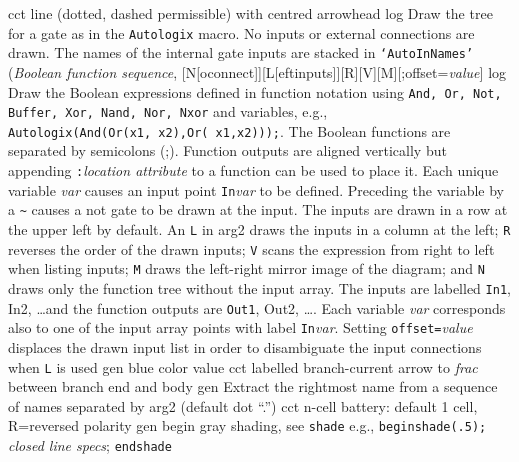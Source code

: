   {cct}
  {line (dotted, dashed permissible) with centred arrowhead
    }
  {log}
  {Draw the tree for a gate as in the {\tt Autologix} macro.  No inputs
   or external connections are drawn.  The names of the internal gate
   inputs are stacked in {\tt `AutoInNames'}}
%
 {({\sl Boolean function sequence},%
    [N[oconnect]][L[eftinputs]][R][V][M][;offset={\sl value}]}
  {log}
  {Draw the Boolean expressions defined in function notation
   using {\tt And, Or, Not, Buffer, Xor, Nand, Nor, Nxor}
   and variables, e.g.,
   {\tt Autologix(And(Or(x1,~x2),Or(~x1,x2)));}.
   The Boolean functions are separated by semicolons (;). Function
   outputs are aligned vertically but appending
   {\tt:}{\sl location attribute} to a function can be used to place it.
   Each unique variable {\sl var} causes an input point {\tt In}{\sl var} 
   to be defined.  Preceding the variable by a {\tt \~{}} causes a not gate
   to be drawn at the input.
   The inputs are drawn in a row at the upper left by default.
   An {\tt L} in arg2 draws the inputs in a column at the left;
   {\tt R} reverses the order of the drawn inputs;
   {\tt V} scans the expression from right to left
   when listing inputs;
   {\tt M} draws the left-right mirror image of the diagram;
   and {\tt N} draws only the function tree without the input array.
   The inputs are labelled {\tt In1}, {In2}, \ldots and the function
   outputs are {\tt Out1}, {Out2}, \dots.
   Each variable {\sl var} corresponds also to one of the input array
   points with label {\tt In}{\sl var}.
   Setting {\tt offset=}{\sl value} displaces the
   drawn input list in order to disambiguate the input connections when {\tt L}
   is used}
%
  {gen}
  {blue color value}
  {cct}
  {labelled branch-current arrow to {\sl frac} between branch end and body
    }
  {gen}
  {Extract the rightmost name from a sequence of names separated by arg2
   (default dot ``.'')}
  {cct}
  {n-cell battery: default 1 cell,
  R=reversed polarity}
  {gen}
  {begin gray shading, see {\tt shade}
   e.g., {\tt beginshade(.5);} {\sl closed line specs}; {\tt endshade}}

